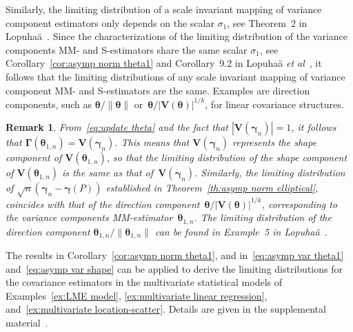 \documentclass{article}
\numberwithin{equation}{section}
\theoremstyle{plain}
\newtheorem{remark}{Remark}[section]
\newcommand{\btheta}{\bm\theta}
\newcommand{\bgamma}{\bm\gamma}
\newcommand{\bGamma}{\bm\Gamma}
\newcommand{\bV}{\mathbf{V}}
\begin{document}
Similarly, the limiting distribution of a scale invariant mapping of variance component estimators
only depends on the scalar $\sigma_1$, see Theorem~2 in Lopuha\"a~\cite{lopuhaa2025}.
Since the characterizations of the limiting distribution of the variance components MM- and S-estimators share the same scalar $\sigma_1$,
see Corollary~\ref{cor:asymp norm theta1} and Corollary~9.2 in Lopuha\"a \emph{et al}~\cite{lopuhaa-gares-ruizgazen2023},
it follows that the limiting distributions of any scale invariant mapping of variance component MM- and S-estimators are the same.
Examples are direction components, such as $\btheta/\|\btheta\|$ or~$\btheta/|\bV(\btheta)|^{1/k}$, for linear covariance structures.

\begin{remark}
\label{rem:asymp distr Vgamma and gamma}
From~\eqref{eq:update theta} and the fact that $|\bV(\bgamma_n)|=1$, 
it follows that $\bGamma(\btheta_{1,n})=\bV(\bgamma_n)$.
This means that $\bV(\bgamma_n)$ represents the shape component of $\bV(\btheta_{1,n})$,
so that the limiting distribution of the shape component of $\bV(\btheta_{1,n})$
is the same as that of~$\bV(\bgamma_n)$.
Similarly, the limiting distribution of $\sqrt{n}(\bgamma_n-\bgamma(P))$ established
in Theorem~\ref{th:asymp norm elliptical}, 
coincides with that of the direction component~$\btheta/|\bV(\btheta)|^{1/k}$, 
corresponding to the variance components MM-estimator~$\btheta_{1,n}$.
The limiting distribution of the direction component $\btheta_{1,n}/\|\btheta_{1,n}\|$
can be found in Example~5 in Lopuha\"a~\cite{lopuhaa2025}.
\end{remark}
The results in Corollary~\ref{cor:asymp norm theta1},  and in~\eqref{eq:asymp var theta1} 
and~\eqref{eq:asymp var shape} can be applied
to derive the limiting distributions for the covariance estimators in the multivariate statistical models
of Examples~\ref{ex:LME model}, \ref{ex:multivariate linear regression}, and~\ref{ex:multivariate location-scatter}.
Details are given in the supplemental material~\cite{supplement2025}.
\end{document}
